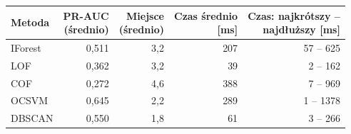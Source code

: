 \begin{tabular}{lrrrr}
\toprule
Metoda & \makecell[r]{PR-AUC\\(średnio)} & \makecell[r]{Miejsce\\(średnio)} & \makecell[r]{Czas średnio\\{}[ms]} & \makecell[r]{Czas: najkrótszy --\\najdłuższy [ms]} \\
\midrule
IForest & 0,511 & 3,2 & 207 & 57 -- 625 \\
LOF & 0,362 & 3,2 & 39 & 2 -- 162 \\
COF & 0,272 & 4,6 & 388 & 7 -- 969 \\
OCSVM & 0,645 & 2,2 & 289 & 1 -- 1378 \\
DBSCAN & 0,550 & 1,8 & 61 & 3 -- 266 \\
\bottomrule
\end{tabular}
